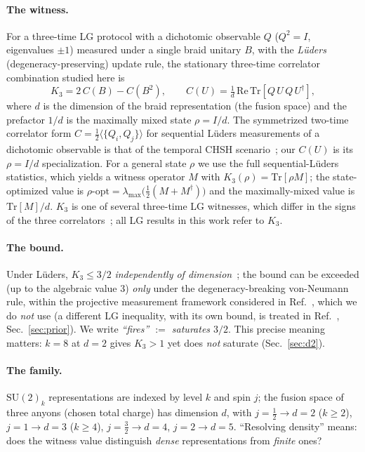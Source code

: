 \documentclass[aps,prx,reprint,amsmath,amssymb,floatfix,nofootinbib,superscriptaddress]{revtex4-2}
\begin{document}
\paragraph{The witness.}
For a three-time LG protocol with a dichotomic observable $Q$ ($Q^2 = I$,
eigenvalues $\pm 1$) measured under a single braid unitary $B$, with the \emph{L\"uders}
(degeneracy-preserving) update rule, the stationary three-time correlator combination studied here is
\begin{equation}
  K_3 = 2\,C(B) - C(B^2),
  \qquad
  C(U) = \tfrac1d\,\mathrm{Re}\,\mathrm{Tr}\!\left[Q\,U\,Q\,U^{\dagger}\right],
\label{eq:K3}
\end{equation}
where $d$ is the dimension of the braid representation (the fusion space) and the
prefactor $1/d$ is the maximally mixed state $\rho = I/d$. The symmetrized
two-time correlator form $C = \tfrac12 \langle \{Q_i, Q_j\} \rangle$ for sequential
L\"uders measurements of a dichotomic observable is that of the temporal CHSH
scenario~\cite{Fri}; our $C(U)$ is its $\rho = I/d$ specialization. For a
general state $\rho$ we use the full sequential-L\"uders statistics, which yields a
witness operator $M$ with $K_3(\rho) = \mathrm{Tr}[\rho M]$; the state-optimized value
is $\rho\text{-opt} = \lambda_{\max}\!\big(\tfrac12 (M + M^{\dagger})\big)$ and the
maximally-mixed value is $\mathrm{Tr}[M]/d$.
$K_3$ is one of several three-time LG witnesses, which differ in the signs of the three correlators~\cite{EmaryLambertNori2014}; all LG results in this work refer to $K_3$.

\paragraph{The bound.}
Under L\"uders, $K_3 \le 3/2$ \emph{independently of dimension}~\cite{BMKG,BE}; the
bound can be exceeded (up to the algebraic value $3$) \emph{only} under the
degeneracy-breaking von-Neumann rule, within the projective measurement framework
considered in Ref.~\cite{BE}, which we do \emph{not} use (a
different LG inequality, with its own bound, is treated in Ref.~\cite{MM},
Sec.~\ref{sec:prior}). We write
\emph{``fires'' $:=$ saturates $3/2$}. This precise meaning matters: $k=8$ at $d=2$
gives $K_3 > 1$ yet does \emph{not} saturate (Sec.~\ref{sec:d2}).

\paragraph{The family.}
$\mathrm{SU}(2)_k$ representations are indexed by level $k$ and spin $j$; the fusion
space of three anyons (chosen total charge) has dimension $d$, with
$j = \tfrac12 \to d = 2$ ($k \ge 2$), $j = 1 \to d = 3$ ($k \ge 4$),
$j = \tfrac32 \to d = 4$, $j = 2 \to d = 5$. ``Resolving density'' means: does the
witness value distinguish \emph{dense} representations from \emph{finite} ones?
\end{document}
